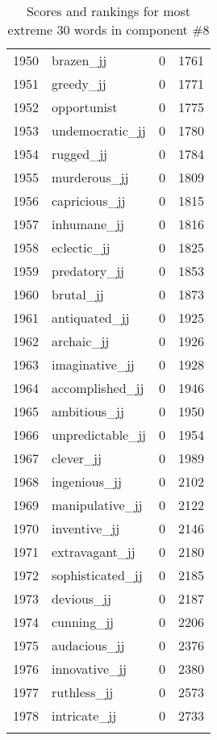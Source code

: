 \begin{longtable}[!htbp]{| rlr@{.}l |}
    1950 & brazen\_jj & 0 & 1761 \\
    1951 & greedy\_jj & 0 & 1771 \\
    1952 & opportunist & 0 & 1775 \\
    1953 & undemocratic\_jj & 0 & 1780 \\
    1954 & rugged\_jj & 0 & 1784 \\
    1955 & murderous\_jj & 0 & 1809 \\
    1956 & capricious\_jj & 0 & 1815 \\
    1957 & inhumane\_jj & 0 & 1816 \\
    1958 & eclectic\_jj & 0 & 1825 \\
    1959 & predatory\_jj & 0 & 1853 \\
    1960 & brutal\_jj & 0 & 1873 \\
    1961 & antiquated\_jj & 0 & 1925 \\
    1962 & archaic\_jj & 0 & 1926 \\
    1963 & imaginative\_jj & 0 & 1928 \\
    1964 & accomplished\_jj & 0 & 1946 \\
    1965 & ambitious\_jj & 0 & 1950 \\
    1966 & unpredictable\_jj & 0 & 1954 \\
    1967 & clever\_jj & 0 & 1989 \\
    1968 & ingenious\_jj & 0 & 2102 \\
    1969 & manipulative\_jj & 0 & 2122 \\
    1970 & inventive\_jj & 0 & 2146 \\
    1971 & extravagant\_jj & 0 & 2180 \\
    1972 & sophisticated\_jj & 0 & 2185 \\
    1973 & devious\_jj & 0 & 2187 \\
    1974 & cunning\_jj & 0 & 2206 \\
    1975 & audacious\_jj & 0 & 2376 \\
    1976 & innovative\_jj & 0 & 2380 \\
    1977 & ruthless\_jj & 0 & 2573 \\
    1978 & intricate\_jj & 0 & 2733 \\
    \hline
    \caption{Scores and rankings for most extreme 30 words in component \#8} \\
\end{longtable}
